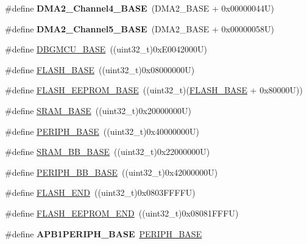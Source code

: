 \begin{DoxyCompactItemize}
\item 
\hypertarget{group___peripheral__memory__map_ga01b063266473f290a55047654fbbfbee}{\#define {\bfseries D\-M\-A2\-\_\-\-Channel4\-\_\-\-B\-A\-S\-E}~(D\-M\-A2\-\_\-\-B\-A\-S\-E + 0x00000044\-U)}\label{group___peripheral__memory__map_ga01b063266473f290a55047654fbbfbee}

\item 
\hypertarget{group___peripheral__memory__map_ga1eea983a5d68bf36f4d19fbb07955ca1}{\#define {\bfseries D\-M\-A2\-\_\-\-Channel5\-\_\-\-B\-A\-S\-E}~(D\-M\-A2\-\_\-\-B\-A\-S\-E + 0x00000058\-U)}\label{group___peripheral__memory__map_ga1eea983a5d68bf36f4d19fbb07955ca1}

\item 
\#define \hyperlink{group___peripheral__memory__map_ga4adaf4fd82ccc3a538f1f27a70cdbbef}{D\-B\-G\-M\-C\-U\-\_\-\-B\-A\-S\-E}~((uint32\-\_\-t)0x\-E0042000\-U)
\item 
\#define \hyperlink{group___peripheral__memory__map_ga23a9099a5f8fc9c6e253c0eecb2be8db}{F\-L\-A\-S\-H\-\_\-\-B\-A\-S\-E}~((uint32\-\_\-t)0x08000000\-U)
\item 
\#define \hyperlink{group___peripheral__memory__map_ga45b9071c81cb72a66e2e3195343fcb3a}{F\-L\-A\-S\-H\-\_\-\-E\-E\-P\-R\-O\-M\-\_\-\-B\-A\-S\-E}~((uint32\-\_\-t)(\hyperlink{group___peripheral__memory__map_ga23a9099a5f8fc9c6e253c0eecb2be8db}{F\-L\-A\-S\-H\-\_\-\-B\-A\-S\-E} + 0x80000\-U))
\item 
\#define \hyperlink{group___peripheral__memory__map_ga05e8f3d2e5868754a7cd88614955aecc}{S\-R\-A\-M\-\_\-\-B\-A\-S\-E}~((uint32\-\_\-t)0x20000000\-U)
\item 
\#define \hyperlink{group___peripheral__memory__map_ga9171f49478fa86d932f89e78e73b88b0}{P\-E\-R\-I\-P\-H\-\_\-\-B\-A\-S\-E}~((uint32\-\_\-t)0x40000000\-U)
\item 
\#define \hyperlink{group___peripheral__memory__map_gad3548b6e2f017f39d399358f3ac98454}{S\-R\-A\-M\-\_\-\-B\-B\-\_\-\-B\-A\-S\-E}~((uint32\-\_\-t)0x22000000\-U)
\item 
\#define \hyperlink{group___peripheral__memory__map_gaed7efc100877000845c236ccdc9e144a}{P\-E\-R\-I\-P\-H\-\_\-\-B\-B\-\_\-\-B\-A\-S\-E}~((uint32\-\_\-t)0x42000000\-U)
\item 
\#define \hyperlink{group___peripheral__memory__map_ga8be554f354e5aa65370f6db63d4f3ee4}{F\-L\-A\-S\-H\-\_\-\-E\-N\-D}~((uint32\-\_\-t)0x0803\-F\-F\-F\-F\-U)
\item 
\#define \hyperlink{group___peripheral__memory__map_gac8cb9b66893a7c4bdff3258909af027a}{F\-L\-A\-S\-H\-\_\-\-E\-E\-P\-R\-O\-M\-\_\-\-E\-N\-D}~((uint32\-\_\-t)0x08081\-F\-F\-F\-U)
\item 
\hypertarget{group___peripheral__memory__map_ga45666d911f39addd4c8c0a0ac3388cfb}{\#define {\bfseries A\-P\-B1\-P\-E\-R\-I\-P\-H\-\_\-\-B\-A\-S\-E}~\hyperlink{group___peripheral__memory__map_ga9171f49478fa86d932f89e78e73b88b0}{P\-E\-R\-I\-P\-H\-\_\-\-B\-A\-S\-E}}\label{group___peripheral__memory__map_ga45666d911f39addd4c8c0a0ac3388cfb}


\end{DoxyCompactItemize}
